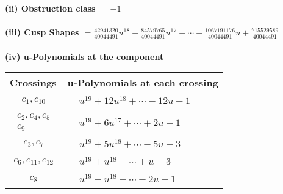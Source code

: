 \documentclass[1p]{elsarticle_modified}
\theoremstyle{definition}
\begin{document}
\flushleft \textbf{(ii) Obstruction class $= -1$}\\~\\
\flushleft \textbf{(iii) Cusp Shapes $= \frac{42941320}{40044491} u^{18}+\frac{84579765}{40044491} u^{17}+\cdots+\frac{1067191176}{40044491} u+\frac{715529589}{40044491}$}\\~\\
\newpage\renewcommand{\arraystretch}{1}
\flushleft \textbf{(iv) u-Polynomials at the component}\newline \\
\begin{tabular}{m{50pt}|m{274pt}}
Crossings & \hspace{64pt}u-Polynomials at each crossing \\
\hline $$\begin{aligned}c_{1},c_{10}\end{aligned}$$&$\begin{aligned}
&u^{19}+12 u^{18}+\cdots-12 u-1
\end{aligned}$\\
\hline $$\begin{aligned}c_{2},c_{4},c_{5}\\c_{9}\end{aligned}$$&$\begin{aligned}
&u^{19}+6 u^{17}+\cdots+2 u-1
\end{aligned}$\\
\hline $$\begin{aligned}c_{3},c_{7}\end{aligned}$$&$\begin{aligned}
&u^{19}+5 u^{18}+\cdots-5 u-3
\end{aligned}$\\
\hline $$\begin{aligned}c_{6},c_{11},c_{12}\end{aligned}$$&$\begin{aligned}
&u^{19}+u^{18}+\cdots+u-3
\end{aligned}$\\
\hline $$\begin{aligned}c_{8}\end{aligned}$$&$\begin{aligned}
&u^{19}- u^{18}+\cdots-2 u-1
\end{aligned}$\\
\hline
\end{tabular}\\~\\
\newpage\renewcommand{\arraystretch}{1}
\end{document}
